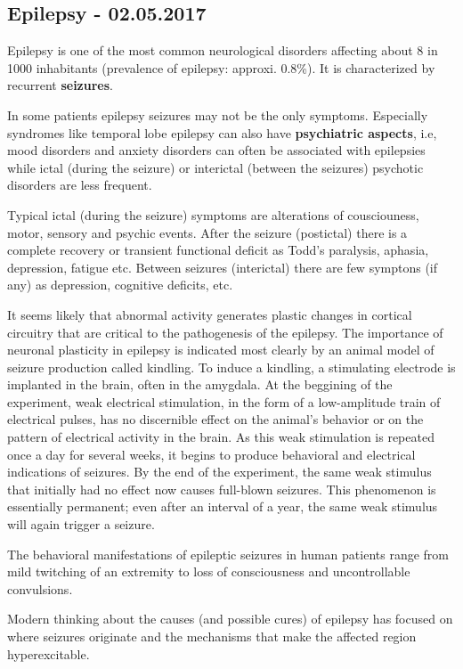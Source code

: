 \documentclass[12pt,article,oneside,a4paper]{memoir}
\begin{document}
\newpage
\subsection{Epilepsy - 02.05.2017}
Epilepsy is one of the most common neurological disorders affecting about 8 in 1000 inhabitants (prevalence of epilepsy: approxi. 0.8\%). It is characterized by recurrent \textbf{seizures}.

In some patients epilepsy seizures may not be the only symptoms. Especially syndromes like temporal lobe epilepsy can also have \textbf{psychiatric aspects}, i.e, mood disorders and anxiety disorders can often be associated with epilepsies while ictal (during the seizure) or interictal (between the seizures) psychotic disorders are less frequent.

Typical ictal (during the seizure) symptoms are alterations of cousciouness, motor, sensory and psychic events. After the seizure (postictal) there is a complete recovery or transient functional deficit as Todd's paralysis, aphasia, depression, fatigue etc. Between seizures (interictal) there are few symptons (if any) as depression, cognitive deficits, etc.

It seems likely that abnormal activity generates plastic changes in cortical circuitry that are critical to the pathogenesis of the epilepsy. The importance of neuronal plasticity in epilepsy is indicated most clearly by an animal model of seizure production called kindling. To induce a kindling, a stimulating electrode is implanted in the brain, often in the amygdala. At the beggining of the experiment, weak electrical stimulation, in the form of a low-amplitude train of electrical pulses, has no discernible effect on the animal’s behavior or on the pattern of electrical activity in the brain. As this weak stimulation is repeated once a day for several weeks, it begins to produce behavioral and electrical indications of seizures. By the end of the experiment, the same weak stimulus that initially had no effect now causes full-blown seizures. This phenomenon is essentially permanent; even after an interval of a year, the same weak stimulus will again trigger a seizure. 

The behavioral manifestations of epileptic seizures in human patients range from mild twitching of an extremity to loss of consciousness and uncontrollable convulsions. 

Modern thinking about the causes (and possible cures) of epilepsy has focused on where seizures originate and the mechanisms that make the affected region hyperexcitable. 
\end{document}

